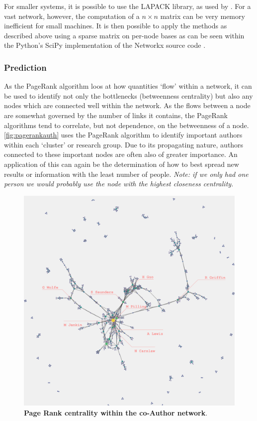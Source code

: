 For smaller systems, it is possible to use the LAPACK \citep{lapack} library, as used by \cite{numpy}. For a vast network, however, the computation of a $n \times n $ matrix can be very memory inefficient for small machines. It is then possible to apply the methods as described above using a sparse matrix on per-node bases as can be seen within the Python's SciPy implementation of the Networkx source code \citep{scipy,networkx}.

\subsubsection{Prediction}\label{sec:applypr}
As the PageRank algorithm loos at how quantities `flow' within a network, it can be used to identify not only the bottlenecks (betweenness centrality) but also any nodes which are connected well within the network. As the flows between a node are somewhat governed by the number of links it contains, the PageRank algorithms tend to correlate, but not dependence, on the betweenness of a node. \autoref{fig:pagerankauth} uses the PageRank algorithm to identify important authors within each `cluster' or research group. Due to its propagating nature, authors connected to these important nodes are often also of greater importance. An application of this can again be the determination of how to best spread new results or information with the least number of people. \textit{Note: if we only had one person we would probably use the node with the highest closeness centrality.}

\begin{figure}[H]
     \centering
         \includegraphics[width=.8\textwidth]{figures_c3/pagerankauthor.png}

        
                \caption{ \textbf{Page Rank centrality within the co-Author network}.}
        \label{fig:pagerankauth}
\end{figure}


